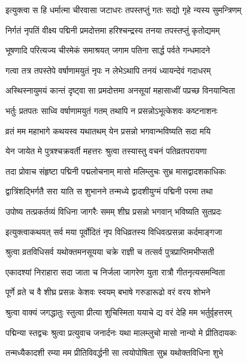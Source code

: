 \twolineshloka
{इत्युक्त्वा स हि धर्मात्मा चीरवासा जटाधरः}
{तपस्तप्तुं गतः सद्यो गृहे न्यस्य सुमन्त्रिणम्} %

\twolineshloka
{निर्गतं नृपतिं वीक्ष्य पद्मिनी प्रमदोत्तमा}
{हरिश्चन्द्रस्य तनया तपस्तप्तुं कृतोद्यमम्} %

\twolineshloka
{भूषणादि परित्यज्य चीरमेकं समाश्रयत्}
{जगाम पतिना सार्द्ध पर्वते गन्धमादने} %

\twolineshloka
{गत्वा तत्र तपस्तेपे वर्षाणामयुतं नृपः}
{न लेभेऽथापि तनयं ध्यायन्देवं गदाधरम्} %

\twolineshloka
{अस्थिस्नायुमयं कान्तं दृष्ट्वा सा प्रमदोत्तमा}
{अनसूयां महासाध्वीं पप्रच्छ विनयान्विता} %

\twolineshloka
{भर्तुः प्रतपतः साध्वि वर्षाणामयुतं गतम्}
{तथापि न प्रसन्नोऽभूत्केशवः कष्टनाशनः} %

\twolineshloka
{व्रतं मम महाभागे कथयस्व यथातथम्}
{येन प्रसन्नो भगवान्भविष्यति सदा मयि} %

\twolineshloka
{येन जायेत मे पुत्रश्चक्रवर्ती महत्तरः}
{श्रुत्वा तस्यास्तु वचनं पतिव्रतपरायणा} %

\twolineshloka
{तदा प्रोवाच संहृष्टा पद्मिनी पद्मलोचनाम् मासो}
{मलिम्लुचः सुभ्र मासद्वादशकाधिकः} %

\twolineshloka
{द्वात्रिंशद्भिर्गतै सरा याति स शुभानने}
{तन्मध्ये द्वादशीयुग्मं पद्मिनी परमा तथा} %

\twolineshloka
{उपोष्य तत्प्रकर्तव्यं विधिना जागरैः समम्}
{शीघ्र प्रसन्नो भगवान् भविष्यति सुतप्रदः} %

\twolineshloka
{इत्युक्त्वाकथयत् सर्व मया पूर्वोदितं नृप}
{विधिव्रतस्य विधिवत्प्रसन्ना कर्दमाङ्गजा} %

\twolineshloka
{श्रुत्वा व्रतविधिसर्व यथोक्तमनसूयया}
{चक्रे राज्ञी च तत्सर्व पुत्रप्राप्तिमभीप्सती} %

\twolineshloka
{एकादश्यां निराहारा सदा जाता च निर्जला}
{जागरेण युता रात्रौ गीतनृत्यसमन्विता} %

\twolineshloka
{पूर्णे व्रते च वै शीघ्र प्रसन्नः केशवः स्वयम्}
{बभाषे गरुडारूढो वरं वरय शोभने} %

\twolineshloka
{श्रुत्वा वाक्यं जगद्धातुः स्तुत्वा प्रीत्या शुचिस्मिता}
{ययाचे द्य वरं देहि मम भर्तुर्वृहत्तरम्} %

\twolineshloka
{पद्मिन्या स्तद्वचः श्रुत्वा प्रत्युवाच जनार्दनः}
{यथा मालम्लुचो मासो नान्यो मे प्रीतिदायकः} %

\twolineshloka
{तन्मध्यैकादशी रम्या मम प्रीतिविवर्द्धनी}
{सा त्वयोपोषिता सुभ्र यथोक्तविधिना शुभे} %

